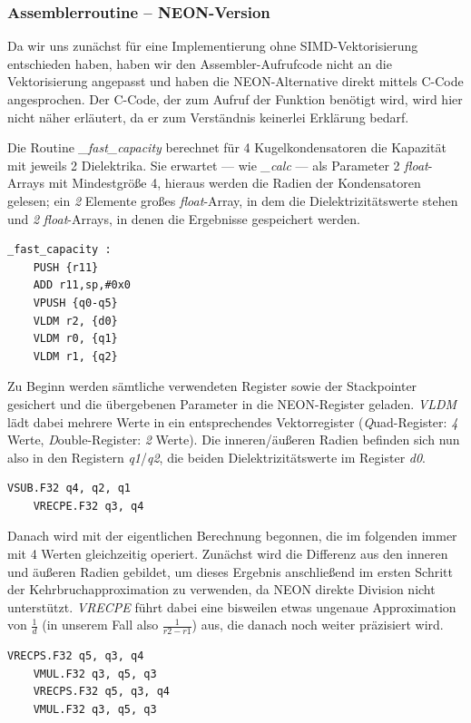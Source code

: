 \documentclass[11pt]{scrartcl}
\begin{document}
\subsubsection{Assemblerroutine -- NEON-Version}

Da wir uns zunächst für eine Implementierung ohne SIMD-Vektorisierung entschieden haben, haben wir den Assembler-Aufrufcode nicht an die Vektorisierung angepasst und haben die NEON-Alternative direkt mittels C-Code angesprochen. Der C-Code, der zum Aufruf der Funktion benötigt wird, wird hier nicht näher erläutert, da er zum Verständnis keinerlei Erklärung bedarf.

Die Routine \emph{\_fast\_capacity} berechnet für 4 Kugelkondensatoren die Kapazität mit jeweils 2 Dielektrika. Sie erwartet --- wie \emph{\_calc} --- als Parameter 2 \emph{float}-Arrays mit Mindestgröße 4, hieraus werden die Radien der Kondensatoren gelesen; ein \emph{2} Elemente großes \emph{float}-Array, in dem die Dielektrizitätswerte stehen und \emph{2} \emph{float}-Arrays, in denen die Ergebnisse gespeichert werden.
\\
\begin{lstlisting}[language={[x86masm]Assembler}]
_fast_capacity :
	PUSH {r11}
	ADD r11,sp,#0x0
	VPUSH {q0-q5}
	VLDM r2, {d0}
	VLDM r0, {q1}
	VLDM r1, {q2}
\end{lstlisting}
Zu Beginn werden sämtliche verwendeten Register sowie der Stackpointer gesichert und die übergebenen Parameter in die NEON-Register geladen. \emph{VLDM} lädt dabei mehrere Werte in ein entsprechendes Vektorregister (\emph{Q}uad-Register: \emph{4} Werte, \emph{D}ouble-Register: \emph{2} Werte). Die inneren/äußeren Radien befinden sich nun also in den Registern \emph{q1}/\emph{q2}, die beiden Dielektrizitätswerte im Register \emph{d0}.
\\
\begin{lstlisting}[language={[x86masm]Assembler}]
	VSUB.F32 q4, q2, q1
	VRECPE.F32 q3, q4
\end{lstlisting}
Danach wird mit der eigentlichen Berechnung begonnen, die im folgenden immer mit 4 Werten gleichzeitig operiert. Zunächst wird die Differenz aus den inneren und äußeren Radien gebildet, um dieses Ergebnis anschließend im ersten Schritt der Kehrbruchapproximation zu verwenden, da NEON direkte Division nicht unterstützt. \emph{VRECPE} führt dabei eine bisweilen etwas ungenaue Approximation von $\frac{1}{d}$ (in unserem Fall also $\frac{1}{r2-r1}$) aus, die danach noch weiter präzisiert wird.
\\
\begin{lstlisting}[language={[x86masm]Assembler}]
	VRECPS.F32 q5, q3, q4
	VMUL.F32 q3, q5, q3
	VRECPS.F32 q5, q3, q4
	VMUL.F32 q3, q5, q3
\end{lstlisting}
\end{document}
